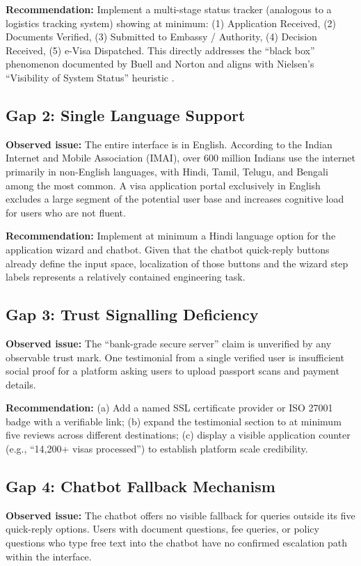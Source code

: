 \documentclass[journal, 10pt, twoside]{IEEEtran}
\begin{document}
\textbf{Recommendation:} Implement a multi-stage status tracker
(analogous to a logistics tracking system) showing at minimum:
(1) Application Received, (2) Documents Verified, (3) Submitted to
Embassy / Authority, (4) Decision Received, (5) e-Visa Dispatched.
This directly addresses the ``black box'' phenomenon documented by
Buell and Norton \cite{buell2011} and aligns with Nielsen's
``Visibility of System Status'' heuristic \cite{nielsen1994}.

\subsection{Gap 2: Single Language Support}
\textbf{Observed issue:} The entire interface is in English. According
to the Indian Internet and Mobile Association (IMAI), over 600 million
Indians use the internet primarily in non-English languages, with Hindi,
Tamil, Telugu, and Bengali among the most common. A visa application
portal exclusively in English excludes a large segment of the potential
user base and increases cognitive load for users who are not fluent.

\textbf{Recommendation:} Implement at minimum a Hindi language option
for the application wizard and chatbot. Given that the chatbot quick-reply
buttons already define the input space, localization of those buttons and
the wizard step labels represents a relatively contained engineering task.

\subsection{Gap 3: Trust Signalling Deficiency}
\textbf{Observed issue:} The ``bank-grade secure server'' claim is
unverified by any observable trust mark. One testimonial from a single
verified user is insufficient social proof for a platform asking users
to upload passport scans and payment details.

\textbf{Recommendation:} (a) Add a named SSL certificate provider
or ISO 27001 badge with a verifiable link; (b) expand the testimonial
section to at minimum five reviews across different destinations; (c)
display a visible application counter (e.g., ``14,200+ visas processed'')
to establish platform scale credibility.

\subsection{Gap 4: Chatbot Fallback Mechanism}
\textbf{Observed issue:} The chatbot offers no visible fallback for
queries outside its five quick-reply options. Users with document
questions, fee queries, or policy questions who type free text into
the chatbot have no confirmed escalation path within the interface.
\end{document}
